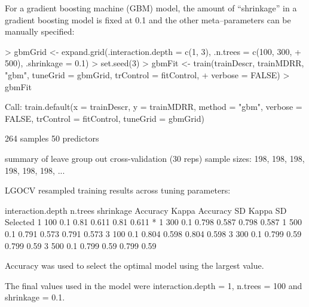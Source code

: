 \documentclass[12pt]{article}
\begin{document}
For a gradient boosting machine (GBM) model, the amount of ``shrinkage'' in a gradient boosting model is fixed at 0.1 and the other meta--parameters can be manually specified:
\pagestyle{plain}
\begin{small}
\begin{landscape}

\begin{Schunk}
\begin{Sinput}
> gbmGrid <- expand.grid(.interaction.depth = c(1, 3), .n.trees = c(100, 300, 
+     500), .shrinkage = 0.1)
> set.seed(3)
> gbmFit <- train(trainDescr, trainMDRR, "gbm", tuneGrid = gbmGrid, trControl = fitControl, 
+     verbose = FALSE)
> gbmFit
\end{Sinput}
\begin{Soutput}
Call:
train.default(x = trainDescr, y = trainMDRR, method = "gbm", 
    verbose = FALSE, trControl = fitControl, tuneGrid = gbmGrid)

264 samples
50 predictors

summary of leave group out cross-validation (30 reps) sample sizes:
    198, 198, 198, 198, 198, 198, ... 

LGOCV resampled training results across tuning parameters:

  interaction.depth  n.trees  shrinkage  Accuracy  Kappa  Accuracy SD  Kappa SD  Selected
  1                  100      0.1        0.81      0.611  0.81         0.611     *       
  1                  300      0.1        0.798     0.587  0.798        0.587             
  1                  500      0.1        0.791     0.573  0.791        0.573             
  3                  100      0.1        0.804     0.598  0.804        0.598             
  3                  300      0.1        0.799     0.59   0.799        0.59              
  3                  500      0.1        0.799     0.59   0.799        0.59              

Accuracy was used to select the optimal model using the largest value.

The final values used in the model were interaction.depth = 1, n.trees = 100 and shrinkage = 0.1.
\end{Soutput}
\end{Schunk}

\end{landscape}
\end{small}
\pagestyle{fancy}
\end{document}
